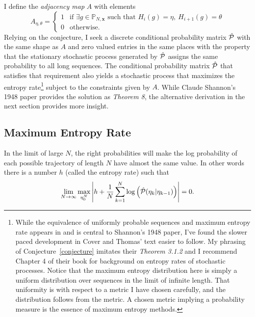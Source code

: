 \documentclass[]{article}
\newcommand{\field}[1]{\mathbb{#1}}
\newcommand\Polytope[1]{\field{P}_{#1}}
\newcommand\PolytopeN{\Polytope{N,\mathbf{x}}}
\newcommand\logf{g}
\newcommand{\T}{{\cal P}}
\newcommand{\Td}{\hat \T} %
\begin{document}
I define the \emph{adjacency map} $A$ with elements
\begin{equation}
  \label{eq:adjacent}
  A_{\eta,\theta} =
  \begin{cases}
    1 & \text{if } \exists \logf \in \PolytopeN \text{ such that }
    H_i(\logf) = \eta,~H_{i+1}(\logf)=\theta \\
    0 & \text{otherwise.}
  \end{cases}
\end{equation}
Relying on the conjecture, I seek a discrete conditional probability
matrix $\Td$ with the same shape as $A$ and zero valued entries in the
same places with the property that the stationary stochastic process
generated by $\Td$ assigns the same probability to all long sequences.
The conditional probability matrix $\Td$ that satisfies that
requirement also yields a stochastic process that maximizes the
entropy rate\footnote{While the equivalence of uniformly probable
  sequences and maximum entropy rate appears in and is central to
  Shannon's 1948 paper\cite{Shannon48}, I've found the slower paced
  development in Cover and Thomas' text\cite{CoverThomas} easier to
  follow.  My phrasing of Conjecture~\ref{conjecture} imitates their
  \emph{Theorem 3.1.2} and I recommend Chapter 4 of their book for
  background on entropy rates of stochastic processes.  Notice that
  the maximum entropy distribution here is simply a uniform
  distribution over sequences in the limit of infinite length.  That
  uniformity is with respect to a metric I have chosen carefully, and
  the distribution follows from the metric.  A chosen metric implying
  a probability measure is the essence of maximum entropy methods.}
subject to the constraints given by $A$.  While Claude Shannon's 1948
paper\cite{Shannon48} provides the solution as \emph{Theorem 8}, the
alternative derivation in the next section provides more insight.

\subsection{Maximum Entropy Rate}
\label{sec:MaxEnt}

In the limit of large $N$, the right probabilities will make the log
probability of each possible trajectory of length $N$ have almost the
same value.  In other words there is a number $h$ (called the entropy
rate) such that
\begin{equation*}
  \lim_{N\rightarrow\infty} \max_{\eta_0^N} \left|h + \frac{1}{N}
    \sum_{k=1}^N \log \left(\Td(\eta_k|\eta_{k-1}) \right) \right| = 0.
\end{equation*}
\end{document}
